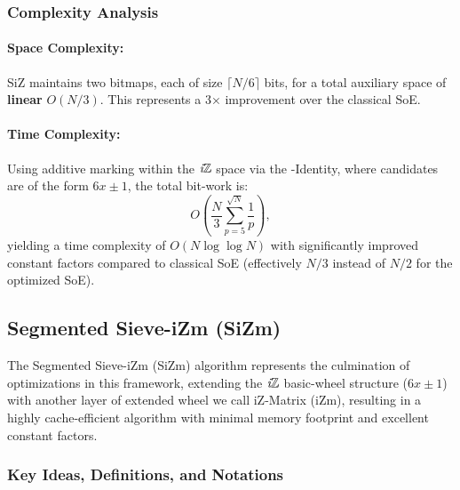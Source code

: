\documentclass{article}
\begin{document}
\subsubsection*{Complexity Analysis}

\paragraph{Space Complexity:} SiZ maintains two bitmaps, each of size $\lceil N/6 \rceil$ bits, for a total auxiliary space of \textbf{linear} $O(N/3)$. This represents a 3× improvement over the classical SoE.

\paragraph{Time Complexity:} Using additive marking within the $\textit{i}\mathbb{Z}$ space via the \Xp-Identity, where candidates are of the form $6x \pm 1$, the total bit-work is:
\[
O\left(\frac{N}{3}\sum_{p=5}^{\sqrt N}\frac{1}{p}\right),
\]
yielding a time complexity of $O(N \log \log N)$ with significantly improved constant factors compared to classical SoE (effectively $N/3$ instead of $N/2$ for the optimized SoE).

\subsection{Segmented Sieve-iZm (SiZm)} \label{alg:sizm}

The Segmented Sieve-iZm (SiZm) algorithm represents the culmination of optimizations in this framework, extending the $\textit{i}\mathbb{Z}$ basic-wheel structure ($6x\pm 1$) with another layer of extended wheel we call iZ-Matrix (iZm), resulting in a highly cache-efficient algorithm with minimal memory footprint and excellent constant factors.

\subsubsection*{Key Ideas, Definitions, and Notations}
\end{document}

